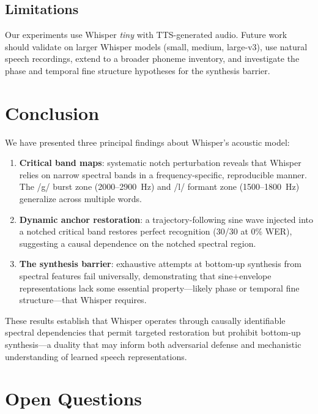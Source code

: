\documentclass[11pt,a4paper]{article}
\begin{document}
\subsection{Limitations}
Our experiments use Whisper \emph{tiny} with TTS-generated audio. Future work
should validate on larger Whisper models (small, medium, large-v3), use natural
speech recordings, extend to a broader phoneme inventory, and investigate the
phase and temporal fine structure hypotheses for the synthesis barrier.

\section{Conclusion}

We have presented three principal findings about Whisper's acoustic model:

\begin{enumerate}[leftmargin=*,itemsep=2pt]
    \item \textbf{Critical band maps}: systematic notch perturbation reveals
        that Whisper relies on narrow spectral bands in a frequency-specific,
        reproducible manner. The /g/ burst zone (2000--2900~Hz) and /l/ formant
        zone (1500--1800~Hz) generalize across multiple words.
    \item \textbf{Dynamic anchor restoration}: a trajectory-following sine wave
        injected into a notched critical band restores perfect recognition
        (30/30 at 0\% WER), suggesting a causal dependence on the notched spectral region.
    \item \textbf{The synthesis barrier}: exhaustive attempts at bottom-up
        synthesis from spectral features fail universally, demonstrating that
        sine+envelope representations lack some essential property---likely
        phase or temporal fine structure---that Whisper requires.
\end{enumerate}

These results establish that Whisper operates through causally identifiable
spectral dependencies that permit targeted restoration but prohibit bottom-up
synthesis---a duality that may inform both adversarial defense and mechanistic
understanding of learned speech representations.

\section*{Open Questions}
\end{document}
